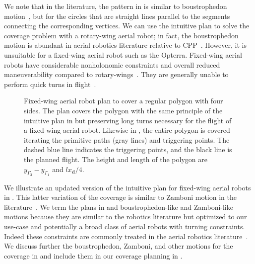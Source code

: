 We note that in the literature, the pattern in  is similar to boustrophedon motion~\citep{choset2005principles,lavalle2006planning,choset2001coverage}, but for the circles that are straight lines parallel to the segments connecting the corresponding vertices.
We can use the intuitive plan to solve the coverage problem with a rotary-wing aerial robot; in fact, the boustrophedon motion is abundant in aerial robotics literature relative to CPP~\citep{difranco2015energy,araujo2013multiple,artemenko2016energy,cabreira2018energy}. However, it is unsuitable for a fixed-wing aerial robot such as the Opterra. Fixed-wing aerial robots have considerable nonholonomic constraints and overall reduced maneuverability compared to rotary-wings~\citep{dille2013efficient,mannadiar2010optimal,xu2011optimal,xu2014efficient}. They are generally unable to perform quick turns in flight~\citep{wang2017curvature}. 
\begin{figure}[h!]
  \centering
  
  \caption[Fixed-wing aerial robot's plan to cover a regular polygon with four sides]{Fixed-wing aerial robot plan to cover a regular polygon with four sides. The plan covers the polygon with the same principle of the intuitive plan in  but preserving long turns necessary for the flight of a fixed-wing aerial robot. Likewise in , the entire polygon is covered iterating the primitive paths (gray lines) and triggering points. The dashed blue line indicates the triggering points, and the black line is the planned flight. The height and length of the polygon are $y_{\Gamma_3}-y_{\Gamma_1}$ and $lx_\mathbf{d}/4$.}
  \label{fig:zambo-like_pb}
\end{figure}
We illustrate an updated version of the intuitive plan for fixed-wing aerial robots in . This latter variation of the coverage is similar to Zamboni motion in the literature~\citep{araujo2013multiple}. 
We term the plans in  and  boustrophedon-like and Zamboni-like motions because they are similar to the robotics literature but optimized to our use-case and potentially a broad class of aerial robots with turning constraints. Indeed these constraints are commonly treated in the aerial robotics literature~\citep{artemenko2016energy,li2011coverage,xu2011optimal,xu2014efficient}. %
We discuss further the boustrophedon, Zamboni, and other motions for the coverage in  and include them in our coverage planning in . 

